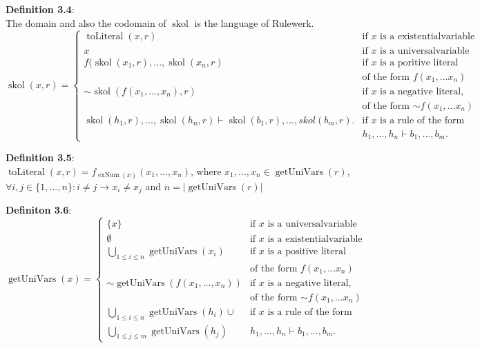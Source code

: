 \documentclass[hyperref, bachelorofscience]{cgvpub}
\renewenvironment{shaded}{%
  \def\FrameCommand{\fboxsep=\FrameSep \colorbox{shadecolor}}%
  \MakeFramed{\advance\hsize-\width \FrameRestore\FrameRestore}}%
 {\endMakeFramed}
\DeclareMathOperator{\skol}{skol}
\DeclareMathOperator{\getUniVars}{getUniVars}
\DeclareMathOperator{\toLiteral}{toLiteral}
\DeclareMathOperator{\exNum}{exNum}
\begin{document}
\begin{shaded}
\textbf{Definition 3.4}: \\
The domain and also the codomain of $\skol$ is the language of Rulewerk. \\

$\skol(x,r) = \begin{cases}
\toLiteral(x,r) & \text{if } x \text{ is a existentialvariable} \\
x & \text{if } x \text{ is a universalvariable} \\
f(\skol(x_1,r),..., \skol(x_n,r) & \text{if } x \text{ is a poritive literal}\\
& \text{of the form } f(x_1,...x_n)\\
\mathord{\sim} \skol(f(x_1,...,x_n),r) & \text{if }x \text{ is a negative literal,} \\
& \text{of the form } \mathord{\sim} f(x_1,...x_n)\\
\skol(h_1,r),...,\skol(h_n,r) \vdash \skol(b_1,r),...,skol(b_m,r). & \text{if } x \text{ is a rule of the form} \\
& h_1,...,h_n \vdash b_1,...,b_m.
\end{cases}
$
\end{shaded}

\begin{shaded}
\textbf{Definition 3.5}: \\
$\toLiteral(x,r) = f_{\exNum(x)}(x_1,...,x_n)$, where $x_1,...,x_n \in \getUniVars(r)$, $\forall i,j \in \{1,...,n\}: i \neq j \rightarrow x_i \neq x_j$ and $n = |\getUniVars(r) |$
\end{shaded}

\begin{shaded}
\textbf{Definiton 3.6}: \\
$\getUniVars(x) = 
\begin{cases}
\{x\} & \text{if } x \text{ is a universalvariable} \\
\emptyset & \text{if } x \text{ is a existentialvariable} \\
\bigcup_{1 \leq i \leq n}\getUniVars(x_i) & \text{if } x \text{ is a positive literal}\\
& \text{of the form } f(x_1,...x_n)\\
\mathord{\sim} \getUniVars(f(x_1,...,x_n)) & \text{if }x \text{ is a negative literal,} \\
& \text{of the form } \mathord{\sim} f(x_1,...x_n)\\
\bigcup_{1 \leq i \leq n}\getUniVars(h_i) \cup & \text{if } x \text{ is a rule of the form}\\
\bigcup_{1 \leq j \leq m}\getUniVars(h_j) & h_1,...,h_n \vdash b_1,...,b_m.
\end{cases}$
\end{shaded}
\end{document}
